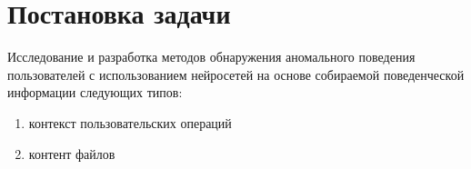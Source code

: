\chapter{Постановка задачи}

Исследование и разработка методов обнаружения аномального поведения пользователей с использованием нейросетей на основе собираемой поведенческой информации следующих типов:
\begin{enumerate}
	\item контекст пользовательских операций
	\item контент файлов
\end{enumerate}